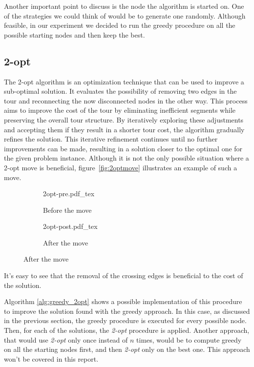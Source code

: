 \documentclass{article}
\begin{document}
Another important point to discuss is the node the algorithm is started on.
One of the strategies we could think of would be to generate one randomly.
Although feasible, in our experiment we decided to run the greedy procedure
on all the possible starting nodes and then keep the best.


\subsection{2-opt}
The 2-opt algorithm is an optimization technique that can be used to improve a sub-optimal solution.
It evaluates the possibility of removing two edges in the tour and reconnecting the now disconnected nodes in the other way.
This process aims to improve the cost of the tour by eliminating inefficient segments while preserving the overall tour structure. By
iteratively exploring these adjustments and accepting them if they result in a shorter tour cost, the algorithm gradually refines
the solution. This iterative refinement continues until no further improvements can be made, resulting in a
solution closer to the optimal one for the given problem instance.
Although it is not the only possible situation where a 2-opt move is
beneficial, figure~\ref{fig:2optmove} illustrates an example of such a move.

\begin{figure}[H]
        \caption{Example of a 2-opt move}
        \label{fig:2optmove}
        \centering
        \begin{subfigure}{.5\textwidth}
                \centering
                \def\svgwidth{.7\linewidth}
                {2opt-pre.pdf_tex}
                \caption{Before the move}
        \end{subfigure}%
        \begin{subfigure}{.5\textwidth}
                \centering
                \def\svgwidth{.7\linewidth}
                {2opt-post.pdf_tex}
                \caption{After the move}
        \end{subfigure}
\end{figure}

It's easy to see that the removal of the crossing edges is beneficial to the
cost of the solution.

Algorithm \ref{alg:greedy_2opt} shows a possible implementation of this procedure to improve
the solution found with the greedy approach. In this case, as discussed in the
previous section, the greedy procedure is executed for every possible node.
Then, for each of the solutions, the \textit{2-opt} procedure is applied.
Another approach, that would use \textit{2-opt} only once instead of $n$ times, would be
to compute greedy on all the starting nodes first, and then \textit{2-opt} only on the
best one. This approach won't be covered in this report.
\end{document}
